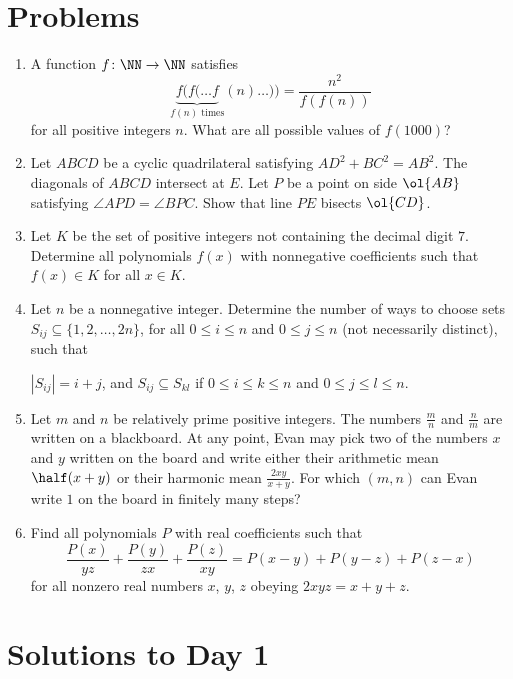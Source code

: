 \documentclass[11pt]{scrartcl}
\begin{document}
\section{Problems}
\begin{enumerate}[\bfseries 1.]
\item %
A function $f \colon \NN \to \NN$ satisfies
\[ \underbrace{f(f(\dots f}_{f(n)\text{ times}} (n)\dots)) %
  = \frac{n^2}{f(f(n))} \]
for all positive integers $n$.
What are all possible values of $f(1000)$?

\item %
Let $ABCD$ be a cyclic quadrilateral
satisfying $AD^2 + BC^2 = AB^2$.
The diagonals of $ABCD$ intersect at $E$.
Let $P$ be a point on side $\ol{AB}$
satisfying $\angle APD = \angle BPC$.
Show that line $PE$ bisects $\ol{CD}$.

\item %
Let $K$ be the set of positive integers not containing the decimal digit $7$.
Determine all polynomials $f(x)$ with nonnegative coefficients
such that $f(x) \in K$ for all $x \in K$.

\item %
Let $n$ be a nonnegative integer.
Determine the number of ways to choose sets
$S_{ij} \subseteq \{1, 2, \dots, 2n\}$,
for all $0 \le i \le n$ and $0 \le j \le n$
(not necessarily distinct), such that
\begin{itemize}
  \ii $|S_{ij}| = i+j$, and
  \ii $S_{ij} \subseteq S_{kl}$ if $0 \le i \le k \le n$
  and $0 \le j \le l \le n$.
\end{itemize}

\item %
Let $m$ and $n$ be relatively prime positive integers.
The numbers $\frac mn$ and $\frac nm$ are written on a blackboard.
At any point, Evan may pick two of the numbers $x$ and $y$
written on the board and write either their arithmetic mean $\half(x+y)$
or their harmonic mean $\frac{2xy}{x+y}$.
For which $(m,n)$ can Evan write $1$ on the board in finitely many steps?

\item %
Find all polynomials $P$ with real coefficients such that
\[ \frac{P(x)}{yz} + \frac{P(y)}{zx} + \frac{P(z)}{xy}
  = P(x-y) + P(y-z) + P(z-x) \]
for all nonzero real numbers $x$, $y$, $z$
obeying $2xyz = x+y+z$.

\end{enumerate}
\pagebreak

\section{Solutions to Day 1}
\end{document}
